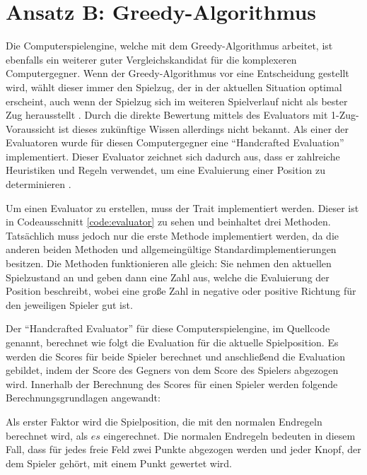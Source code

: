 \section{Ansatz B: Greedy-Algorithmus}

Die Computerspielengine, welche mit dem Greedy-Algorithmus arbeitet, ist ebenfalls ein weiterer guter Vergleichskandidat für die komplexeren Computergegner. Wenn der Greedy-Algorithmus vor eine Entscheidung gestellt wird, wählt dieser immer den Spielzug, der in der aktuellen Situation optimal erscheint, auch wenn der Spielzug sich im weiteren Spielverlauf nicht als bester Zug herausstellt \cite[S. 234]{2023Greedy}. Durch die direkte Bewertung mittels des Evaluators mit 1-Zug-Voraussicht ist dieses zukünftige Wissen allerdings nicht bekannt. Als einer der Evaluatoren wurde für diesen Computergegner eine \enquote{Handcrafted Evaluation} implementiert. Dieser Evaluator zeichnet sich dadurch aus, dass er zahlreiche Heuristiken und Regeln verwendet, um eine Evaluierung einer Position zu determinieren \cite{2023.StockfishTerminology}.



\pagebreak

Um einen Evaluator zu erstellen, muss der Trait  implementiert werden. Dieser ist in Codeausschnitt \ref{code:evaluator} zu sehen und beinhaltet drei Methoden. Tatsächlich muss jedoch nur die erste Methode  implementiert werden, da die anderen beiden Methoden  und  allgemeingültige Standardimplementierungen besitzen. Die Methoden funktionieren alle gleich: Sie nehmen den aktuellen Spielzustand an und geben dann eine Zahl aus, welche die Evaluierung der Position beschreibt, wobei eine große Zahl in negative oder positive Richtung für den jeweiligen Spieler gut ist.

Der \enquote{Handcrafted Evaluator} für diese Computerspielengine,  im Quellcode genannt, berechnet wie folgt die Evaluation für die aktuelle Spielposition. Es werden die Scores für beide Spieler berechnet und anschließend die Evaluation gebildet, indem der Score des Gegners von dem Score des Spielers abgezogen wird. Innerhalb der Berechnung des Scores für einen Spieler werden folgende Berechnungsgrundlagen angewandt:

Als erster Faktor wird die Spielposition, die mit den normalen Endregeln berechnet wird, als $es$ eingerechnet. Die normalen Endregeln bedeuten in diesem Fall, dass für jedes freie Feld zwei Punkte abgezogen werden und jeder Knopf, der dem Spieler gehört, mit einem Punkt gewertet wird.

